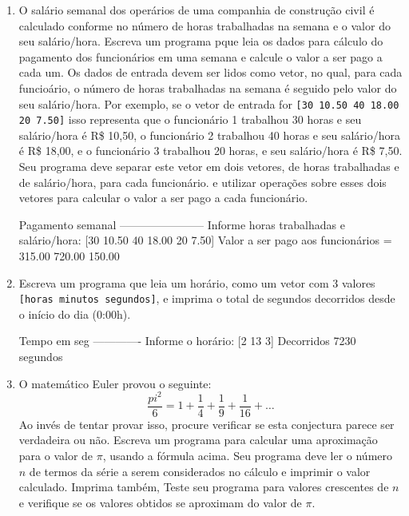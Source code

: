 \documentclass[11pt,fleqn]{practice}
\begin{document}
\begin{enumerate}

\item O salário semanal dos operários de uma companhia de construção civil é calculado conforme no número de horas trabalhadas na semana e o valor do seu salário/hora. Escreva um programa pque leia os dados para cálculo do pagamento dos funcionários em uma semana e calcule o valor a ser pago a cada um. Os dados de entrada devem ser lidos como vetor, no qual, para cada funcioário, o número de horas trabalhadas na semana é seguido pelo valor do seu salário/hora. Por exemplo, se o vetor de entrada for \texttt{[30 10.50 40 18.00 20 7.50]} isso representa que o funcionário 1 trabalhou 30 horas e seu salário/hora é R\$ 10,50, o funcionário 2 trabalhou 40 horas e seu salário/hora é R\$ 18,00, e o funcionário 3 trabalhou 20 horas, e seu salário/hora é R\$ 7,50. Seu programa deve separar este vetor em dois vetores, de horas trabalhadas e de salário/hora, para cada funcionário. e utilizar operações sobre esses dois vetores para calcular o valor a ser pago a cada funcionário.  

\begin{runexample}
Pagamento semanal
-----------------------
Informe horas trabalhadas e salário/hora: [30 10.50 40 18.00 20 7.50]
Valor a ser pago aos funcionários = 315.00    720.00    150.00 
\end{runexample}


\item Escreva um programa que leia um horário, como um vetor com 3 valores \texttt{[horas minutos segundos]}, e imprima o total de segundos decorridos desde o início do dia (0:00h).

\begin{runexample}
Tempo em seg
-------------
Informe o horário: [2 13 3]
Decorridos 7230 segundos
\end{runexample}

\item O matemático Euler provou o seguinte:
\[ \frac{pi^2}{6} = 1 + \frac{1}{4} + \frac{1}{9} + \frac{1}{16} + \ldots\]
 Ao invés de tentar provar isso, procure verificar se esta conjectura parece ser verdadeira ou não. Escreva um programa para calcular uma aproximação para o valor de $\pi$, usando a fórmula acima. Seu programa deve ler o número $n$ de termos da série a serem considerados no cálculo e imprimir o valor calculado. Imprima também, Teste seu programa para valores crescentes de $n$ e verifique se os valores obtidos se aproximam do valor de $\pi$.


\end{enumerate}
\end{document}
